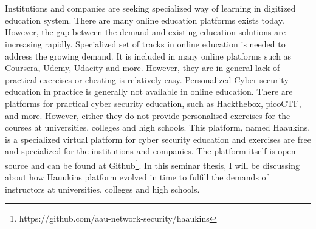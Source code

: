 \chapter{\abstractname}

Institutions and companies are seeking specialized way of learning in digitized education system. 
There are many online education platforms exists today. However,
the gap between the demand and existing education solutions are increasing rapidly.
Specialized set of tracks in online education is needed to address the growing demand.
It is included in many online platforms such as Coursera, Udemy, Udacity and more. 
However, they are in general lack of practical exercises or cheating is relatively easy.
Personalized Cyber security education in practice is generally not available in online education.
There are platforms for practical cyber security education, such as Hackthebox, picoCTF, and more.
However, either they do not provide personalised exercises for the courses at universities, colleges and high schools. 
This platform, named Haaukins, is a specialized virtual platform for cyber security education and exercises are free and specialized for the institutions and companies.
The platform itself is open source and can be found at Github\footnote{https://github.com/aau-network-security/haaukins}.
In this seminar thesis, I will be discussing about how Hauukins platform evolved in time to fulfill the demands of instructors at universities, colleges and high schools.

\makeatletter
{}
{\renewcommand{\abstractname}{Kurzfassung}}
{\renewcommand{\abstractname}{Abstract}}
\makeatother






